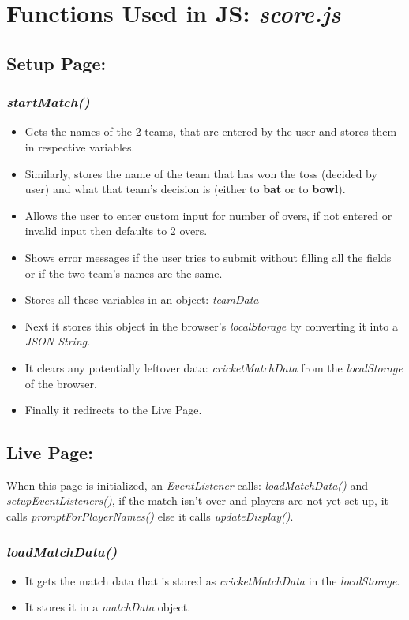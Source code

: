 \documentclass[a4paper,12pt]{article}
\begin{document}
\section{Functions Used in JS: \textit{score.js}}

\subsection{Setup Page:}
\subsubsection{\textit{startMatch()}}
\begin{itemize}
\item Gets the names of the 2 teams, that are entered by the user and stores them in respective variables.
\item Similarly, stores the name of the team that has won the toss (decided by user) and what that team's decision is (either to \textbf{bat} or to \textbf{bowl}).
\item Allows the user to enter custom input for number of overs, if not entered or invalid input then defaults to 2 overs.
\item Shows error messages if the user tries to submit without filling all the fields or if the two team's names are the same.
\item Stores all these variables in an object: \textit{teamData}
\item Next it stores this object in the browser's \textit{localStorage} by converting it into a \textit{JSON String}.
\item It clears any potentially leftover data: \textit{cricketMatchData} from the \textit{localStorage} of the browser.
\item Finally it redirects to the Live Page.
\end{itemize}

\subsection{Live Page:}
When this page is initialized, an \textit{EventListener} calls: \textit{loadMatchData()} and \textit{setupEventListeners()}, 
if the match isn't over and players are not yet set up, it calls \textit{promptForPlayerNames()} else it calls \textit{updateDisplay()}.
\subsubsection{\textit{loadMatchData()}}
\begin{itemize}
\item It gets the match data that is stored as \textit{cricketMatchData} in the \textit{localStorage}.
\item It stores it in a \textit{matchData} object. 
\end{itemize}
\end{document}
